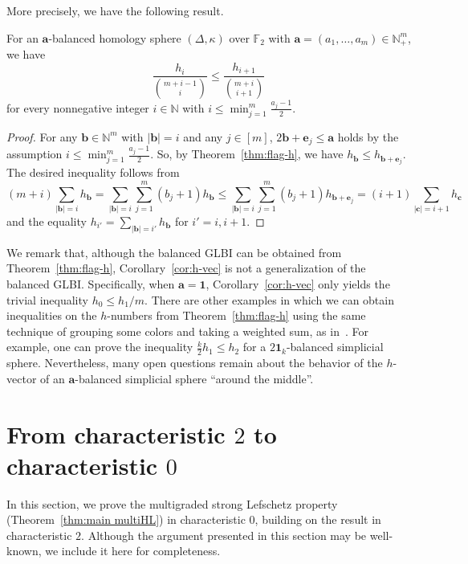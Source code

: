 More precisely, we have the following result.
\begin{coro} \label{cor:h-vec}
For an $\bm{a}$-balanced homology sphere $(\Delta,\kappa)$ over $\mathbb{F}_2$ with $\bm{a}=(a_1,\ldots,a_m) \in \mathbb{N}^m_+$, we have
\[
\frac{h_i}{\binom{m+i-1}{i}} \leq \frac{h_{i+1}}{\binom{m+i}{i+1}}
\]
for every nonnegative integer $i \in \mathbb{N}$ with $i \leq \min_{j=1}^m \frac{a_j-1}{2}$.
\end{coro}
\begin{proof}[Proof]
For any $\bm{b} \in \mathbb{N}^m$ with $|\bm{b}|=i$ and any $j \in[m]$, $2\bm{b}+\bm{e}_j \leq \bm{a}$ holds by the assumption $i \leq \min_{j=1}^m \frac{a_j-1}{2}$.
So, by Theorem~\ref{thm:flag-h}, we have $h_{\bm{b}} \leq h_{\bm{b}+\bm{e}_j}$.
The desired inequality follows from
\[
(m+i)\sum_{|\bm{b}|=i}h_{\bm{b}} = \sum_{|\bm{b}|=i}\sum_{j=1}^m (b_j+1) h_{\bm{b}} \leq \sum_{|\bm{b}|=i}\sum_{j=1}^m (b_j+1) h_{\bm{b}+\bm{e}_j} =(i+1)\sum_{|\bm{c}|=i+1}h_{\bm{c}}
\]
and the equality $h_{i'}=\sum_{|\bm{b}|=i'} h_{\bm{b}}$ for $i'=i,i+1$.
\end{proof}
We remark that, although the balanced GLBI can be obtained from Theorem~\ref{thm:flag-h}, Corollary~\ref{cor:h-vec} is not a generalization of the balanced GLBI. Specifically, when $\bm{a}=\bm{1}$, Corollary~\ref{cor:h-vec} only yields the trivial inequality $h_0 \leq h_1/m$.
There are other examples in which we can obtain inequalities on the $h$-numbers from Theorem~\ref{thm:flag-h} using the same technique of grouping some colors and taking a weighted sum, as in~\cite{JM,KN}. 
For example, one can prove the inequality $\frac{k}{2} h_1 \leq h_2$ for a $2\bm{1}_k$-balanced simplicial sphere.
Nevertheless, many open questions remain about the behavior of the $h$-vector of an $\bm{a}$-balanced simplicial sphere ``around the middle''.


\section{From characteristic \texorpdfstring{$2$}{2} to characteristic \texorpdfstring{$0$}{0}}
In this section, we prove the multigraded strong Lefschetz property (Theorem~\ref{thm:main multiHL}) in characteristic $0$, building on the result in characteristic $2$.
Although the argument presented in this section may be well-known, we include it here for completeness.

